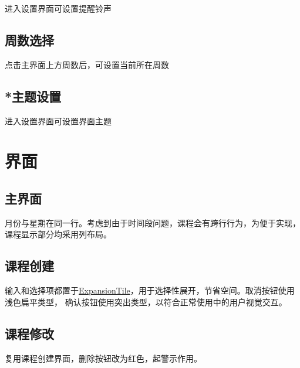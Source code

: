 \documentclass{article}
\begin{document}
      进入设置界面可设置提醒铃声

  \subsection{周数选择}

    点击主界面上方周数后，可设置当前所在周数

  \subsection{*主题设置}

    进入设置界面可设置界面主题

\section{界面}

  \subsection{主界面}

    月份与星期在同一行。考虑到由于时间段问题，课程会有跨行行为，为便于实现，课程显示部分均采用列布局。

  \subsection{课程创建}

    输入和选择项都置于\uline{ExpansionTile}，用于选择性展开，节省空间。取消按钮使用浅色扁平类型，
    确认按钮使用突出类型，以符合正常使用中的用户视觉交互。

  \subsection{课程修改}

    复用课程创建界面，删除按钮改为红色，起警示作用。
\end{document}
